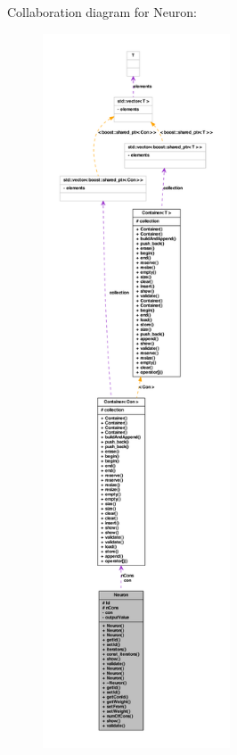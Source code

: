 Collaboration diagram for Neuron:
\nopagebreak
\begin{figure}[H]
\begin{center}
\leavevmode
\includegraphics[height=600pt]{class_neuron__coll__graph}
\end{center}
\end{figure}
